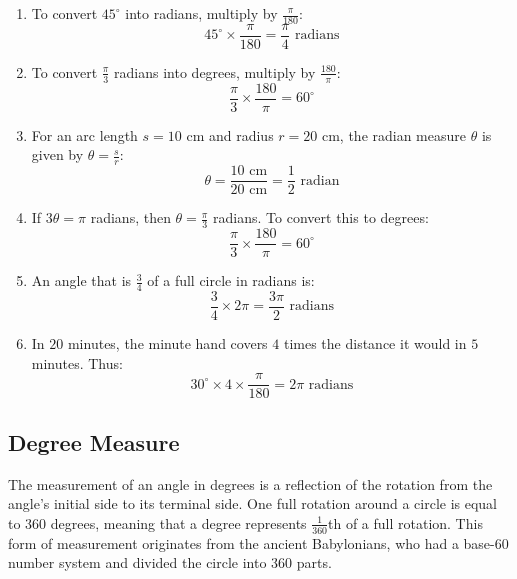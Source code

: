 \documentclass[a4paper,12pt]{book}
\begin{document}
\begin{enumerate}
    \item To convert \(45^\circ\) into radians, multiply by \(\frac{\pi}{180}\):
    \[
    45^\circ \times \frac{\pi}{180} = \frac{\pi}{4} \text{ radians}
    \]

    \item To convert \(\frac{\pi}{3}\) radians into degrees, multiply by \(\frac{180}{\pi}\):
    \[
    \frac{\pi}{3} \times \frac{180}{\pi} = 60^\circ
    \]

    \item For an arc length \( s = 10 \) cm and radius \( r = 20 \) cm, the radian measure \( \theta \) is given by \( \theta = \frac{s}{r} \):
    \[
    \theta = \frac{10 \text{ cm}}{20 \text{ cm}} = \frac{1}{2} \text{ radian}
    \]

    \item If \( 3\theta = \pi \) radians, then \( \theta = \frac{\pi}{3} \) radians. To convert this to degrees:
    \[
    \frac{\pi}{3} \times \frac{180}{\pi} = 60^\circ
    \]

    \item An angle that is \( \frac{3}{4} \) of a full circle in radians is:
    \[
    \frac{3}{4} \times 2\pi = \frac{3\pi}{2} \text{ radians}
    \]

    \item In \(20\) minutes, the minute hand covers \(4\) times the distance it would in \(5\) minutes. Thus:
    \[
    30^\circ \times 4 \times \frac{\pi}{180} = 2\pi \text{ radians}
    \]
\end{enumerate}






\subsection{Degree Measure}
\label{subsec:degree_measure}
The measurement of an angle in degrees is a reflection of the rotation from the angle's initial side to its terminal side. One full rotation around a circle is equal to 360 degrees, meaning that a degree represents \(\frac{1}{360}\)th of a full rotation. This form of measurement originates from the ancient Babylonians, who had a base-60 number system and divided the circle into 360 parts.
\end{document}
